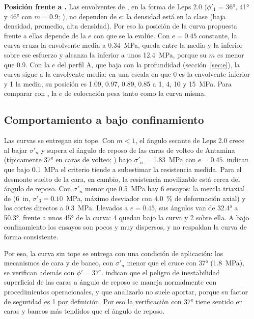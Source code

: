 \documentclass[11pt,letterpaper]{article}
\begin{document}
\textbf{Posición frente a \citet{leps}.} Las envolventes de \citet{leps}, en la forma de Leps 2.0 ($\phi'_1$ = 36°, 41° y 46° con $m = 0.9$; \citealp[p.~2]{cylwik}), no dependen de $e$: la densidad está en la clase (baja densidad, promedio, alta densidad). Por eso la posición de la curva propuesta frente a ellas depende de la $e$ con que se la evalúe. Con $e = 0.45$ constante, la curva cruza la envolvente media a 0.34~MPa, queda entre la media y la inferior sobre ese esfuerzo y alcanza la inferior a unos 12.4~MPa, porque su $m$ es menor que 0.9. Con la $e$ del perfil A, que baja con la profundidad (sección~\ref{sec:e}), la curva sigue a la envolvente media: en una escala en que 0 es la envolvente inferior y 1 la media, su posición es 1.09, 0.97, 0.89, 0.85 a 1, 4, 10 y 15~MPa. Para comparar con \citet{leps}, la $e$ de colocación pesa tanto como la curva misma.

\subsection*{Comportamiento a bajo confinamiento}
Las curvas se entregan sin tope. Con $m < 1$, el ángulo secante de Leps 2.0 crece al bajar $\sigma'_n$ y supera el ángulo de reposo de las caras de volteo de Antamina (típicamente 37° en caras de volteo; \citealp[§16.5]{hc2017}) bajo $\sigma'_n$ = 1.83~MPa con $e = 0.45$. \citet{cylwik} indican que bajo 0.1~MPa el criterio tiende a subestimar la resistencia medida. Para el desmonte suelto de la cara, en cambio, la resistencia movilizable está cerca del ángulo de reposo. Con $\sigma'_n$ menor que 0.5~MPa hay 6 ensayos: la mezcla triaxial de \citet{g2021} (6~in, $\sigma'_3 = 0.10$~MPa, máximo desviador con 4.0~\% de deformación axial) y los cortes directos a 0.3~MPa. Llevados a $e = 0.45$, sus ángulos van de 32.4° a 50.3°, frente a unos 45° de la curva: 4 quedan bajo la curva y 2 sobre ella. A bajo confinamiento los ensayos son pocos y muy dispersos, y no respaldan la curva de forma consistente.

Por eso, la curva sin tope se entrega con una condición de aplicación: los mecanismos de cara y de banco, con $\sigma'_n$ menor que el cruce con 37° (1.8~MPa), se verifican además con $\phi' = 37^{\circ}$. \citet[§8.4.1.1]{hc2017} indican que el peligro de inestabilidad superficial de las caras a ángulo de reposo se maneja normalmente con procedimientos operacionales, y que analizarlo no suele aportar, porque su factor de seguridad es 1 por definición. Por eso la verificación con 37° tiene sentido en caras y bancos más tendidos que el ángulo de reposo.
\end{document}
